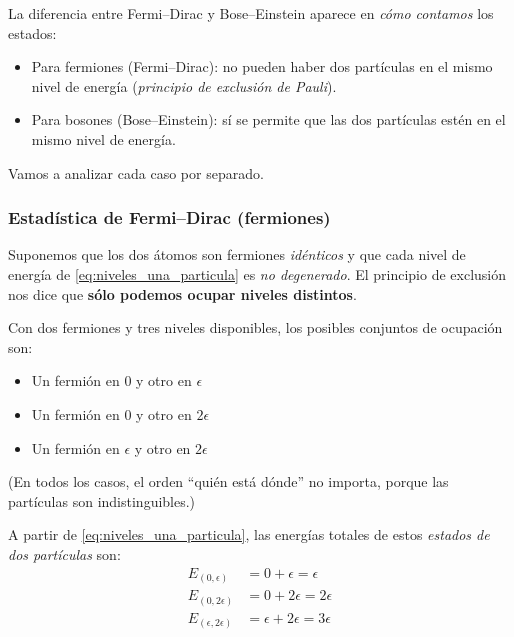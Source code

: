 \documentclass{article}
\begin{document}
La diferencia entre Fermi–Dirac y Bose–Einstein aparece en
\textcolor{Lochinvar}{\emph{cómo contamos}} los estados:
\begin{itemize}
    \item[$\bullet$] Para \textcolor{Lochinvar}{fermiones} (Fermi–Dirac): no pueden haber dos partículas en el mismo nivel
    de energía (\emph{principio de exclusión de Pauli}).
    \item[$\bullet$] Para \textcolor{orange(colorwheel)}{bosones} (Bose–Einstein): sí se permite que las dos partículas estén
    en el mismo nivel de energía.
\end{itemize}

Vamos a analizar cada caso por separado.

\subsubsection*{\textcolor{Lochinvar}{Estadística de Fermi–Dirac (fermiones)}}

Suponemos que los dos átomos son fermiones \emph{idénticos} y que cada nivel de
energía de \eqref{eq:niveles_una_particula} es \emph{no degenerado}.  
El principio de exclusión nos dice que \textbf{sólo podemos ocupar niveles distintos}.

Con dos fermiones y tres niveles disponibles, los posibles conjuntos de ocupación son:
\begin{itemize}
    \item[$\bullet$] Un fermión en \(0\) y otro en \(\epsilon\)
    \item[$\bullet$] Un fermión en \(0\) y otro en \(2\epsilon\)
    \item[$\bullet$] Un fermión en \(\epsilon\) y otro en \(2\epsilon\)
\end{itemize}
(En todos los casos, el orden “quién está dónde” no importa, porque las partículas
son indistinguibles.)

A partir de \eqref{eq:niveles_una_particula}, las energías totales de estos
\emph{estados de dos partículas} son:
\begin{equation}
\begin{split}
E_{(0,\epsilon)} &= 0 + \epsilon = \epsilon \\[4pt]
E_{(0,2\epsilon)} &= 0 + 2\epsilon = 2\epsilon \\[4pt]
E_{(\epsilon,2\epsilon)} &= \epsilon + 2\epsilon = 3\epsilon
\end{split}\label{eq:energias_FD}
\end{equation}
\end{document}
